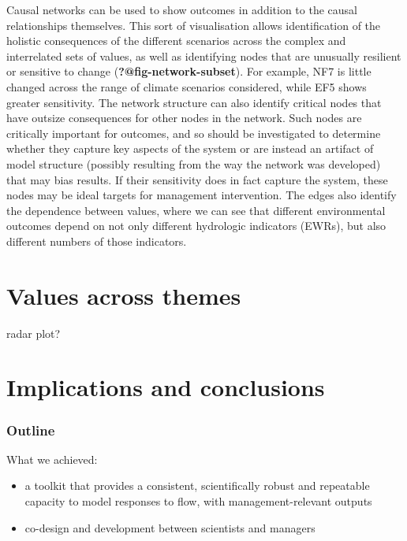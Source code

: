 \documentclass[
  number]{elsarticle}
\begin{document}
Causal networks can be used to show outcomes in addition to the causal
relationships themselves. This sort of visualisation allows
identification of the holistic consequences of the different scenarios
across the complex and interrelated sets of values, as well as
identifying nodes that are unusually resilient or sensitive to change
(\textbf{?@fig-network-subset}). For example, NF7 is little changed
across the range of climate scenarios considered, while EF5 shows
greater sensitivity. The network structure can also identify critical
nodes that have outsize consequences for other nodes in the network.
Such nodes are critically important for outcomes, and so should be
investigated to determine whether they capture key aspects of the system
or are instead an artifact of model structure (possibly resulting from
the way the network was developed) that may bias results. If their
sensitivity does in fact capture the system, these nodes may be ideal
targets for management intervention. The edges also identify the
dependence between values, where we can see that different environmental
outcomes depend on not only different hydrologic indicators (EWRs), but
also different numbers of those indicators.

\hypertarget{values-across-themes}{%
\section{Values across themes}\label{values-across-themes}}

radar plot?

\hypertarget{implications-and-conclusions}{%
\section{Implications and
conclusions}\label{implications-and-conclusions}}

\hypertarget{outline}{%
\subsubsection{Outline}\label{outline}}

What we achieved:

\begin{itemize}
\item
  a toolkit that provides a consistent, scientifically robust and
  repeatable capacity to model responses to flow, with
  management-relevant outputs
\item
  co-design and development between scientists and managers
\end{itemize}
\end{document}
